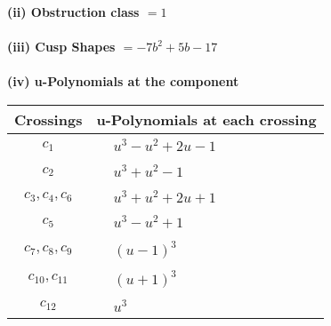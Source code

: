 \documentclass[1p]{elsarticle_modified}
\theoremstyle{definition}
\begin{document}
\flushleft \textbf{(ii) Obstruction class $= 1$}\\~\\
\flushleft \textbf{(iii) Cusp Shapes $= -7 b^2+5 b-17$}\\~\\
\newpage\renewcommand{\arraystretch}{1}
\flushleft \textbf{(iv) u-Polynomials at the component}\newline \\
\begin{tabular}{m{50pt}|m{274pt}}
Crossings & \hspace{64pt}u-Polynomials at each crossing \\
\hline $$\begin{aligned}c_{1}\end{aligned}$$&$\begin{aligned}
&u^3- u^2+2 u-1
\end{aligned}$\\
\hline $$\begin{aligned}c_{2}\end{aligned}$$&$\begin{aligned}
&u^3+u^2-1
\end{aligned}$\\
\hline $$\begin{aligned}c_{3},c_{4},c_{6}\end{aligned}$$&$\begin{aligned}
&u^3+u^2+2 u+1
\end{aligned}$\\
\hline $$\begin{aligned}c_{5}\end{aligned}$$&$\begin{aligned}
&u^3- u^2+1
\end{aligned}$\\
\hline $$\begin{aligned}c_{7},c_{8},c_{9}\end{aligned}$$&$\begin{aligned}
&(u-1)^3
\end{aligned}$\\
\hline $$\begin{aligned}c_{10},c_{11}\end{aligned}$$&$\begin{aligned}
&(u+1)^3
\end{aligned}$\\
\hline $$\begin{aligned}c_{12}\end{aligned}$$&$\begin{aligned}
&u^3
\end{aligned}$\\
\hline
\end{tabular}\\~\\
\end{document}
